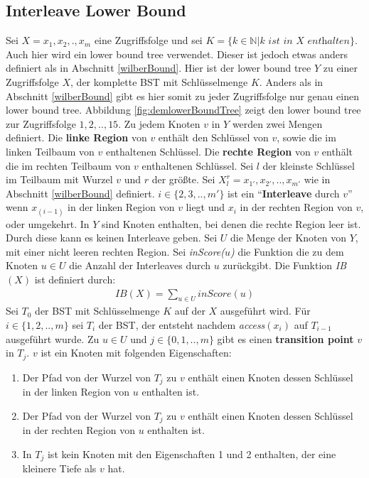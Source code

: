 \documentclass[a4paper,12pt]{article}
\begin{document}
\subsection{Interleave Lower Bound} \label{interBound}
Sei $X = x_1,x_2,.,x_m$ eine Zugriffsfolge und sei $K = \{k \in \mathbb{N} \vert k \textit{ ist in $X$ enthalten}\}$. Auch hier wird ein lower bound tree verwendet. Dieser ist jedoch etwas anders definiert als in Abschnitt \ref{wilberBound}. Hier ist der lower bound tree $Y$ zu einer Zugriffsfolge $X$, der komplette BST mit Schlüsselmenge $K$. Anders als in Abschnitt \ref{wilberBound}  gibt es hier somit zu jeder Zugriffsfolge nur genau einen lower bound tree. Abbildung \ref{fig:demlowerBoundTree} zeigt den lower bound tree zur Zugriffsfolge $1, 2,.., 15$. Zu jedem Knoten $v$ in $Y$ werden zwei Mengen definiert. Die \textbf{linke Region} von $v$ enthält den Schlüssel von $v$, sowie die im linken Teilbaum von $v$ enthaltenen Schlüssel.  Die \textbf{rechte Region} von $v$ enthält die im rechten Teilbaum von $v$ enthaltenen Schlüssel. Sei $l$ der kleinste Schlüssel im Teilbaum mit Wurzel $v$ und $r$ der größte. Sei  $X^r_l = {x_{1'},x_{2'},..,x_{m'}}$ wie in Abschnitt \ref{wilberBound} definiert. $i \in \{2,3,..,m'\}$ ist ein \enquote{\textbf{Interleave} durch $v$} wenn $x_{\left(i -1\right)}$ in der linken Region von $v$ liegt und $x_i$ in der rechten Region von $v$, oder umgekehrt. In $Y$ sind Knoten enthalten, bei denen die rechte Region leer ist. Durch diese kann es keinen Interleave geben. Sei $U$ die Menge der Knoten von $Y$, mit einer nicht leeren rechten Region. Sei \textit{inScore($u$)} die Funktion die zu dem Knoten $u \in U$ die Anzahl der Interleaves durch $u$ zurückgibt.  Die Funktion \textit{IB$\left(X\right)$} ist definiert durch:
\begin{align*}
\mathit{IB}\left(X\right) = \sum_{u \in U} \mathit{inScore}\left(u\right)
\end{align*}
Sei $T_0$ der BST mit Schlüsselmenge $K$ auf der $X$ ausgeführt wird. Für $i \in \{1,2,..,m\}$ sei $T_i$ der BST, der entsteht nachdem \textit{access}$\left(x_i\right)$ auf $T_{i-1}$ ausgeführt wurde. Zu $u \in U$ und  $j \in \{0,1,..,m\}$ gibt es einen \textbf{transition point} $v$ in $T_j$. $v$ ist ein Knoten mit folgenden Eigenschaften:\\
\begin{enumerate}
	\item Der Pfad von der Wurzel von $T_j$ zu $v$ enthält einen Knoten dessen Schlüssel in der linken Region von $u$ enthalten ist.
	\item Der Pfad von der Wurzel von $T_j$ zu $v$ enthält einen Knoten dessen Schlüssel in der rechten Region von $u$ enthalten ist.
	\item In $T_j$ ist kein Knoten mit den Eigenschaften 1 und 2 enthalten, der eine kleinere Tiefe als $v$ hat. 
\end{enumerate}
\end{document}
